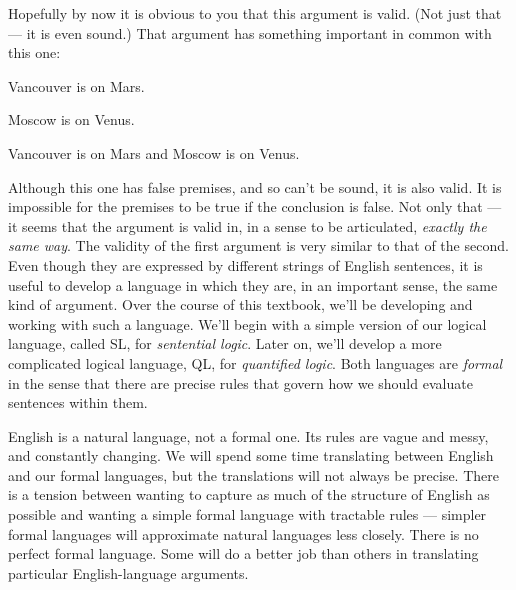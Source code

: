 Hopefully by now it is obvious to you that this argument is valid. (Not just that --- it is even sound.) That argument has something important in common with this one:

\begin{earg}
\item[] Vancouver is on Mars.
\item[] Moscow is on Venus.
\item[\therefore] Vancouver is on Mars and Moscow is on Venus.
\end{earg}

Although this one has false premises, and so can't be sound, it is also valid. It is impossible for the premises to be true if the conclusion is false. Not only that --- it seems that the argument is valid in, in a sense to be articulated, \emph{exactly the same way}. The validity of the first argument is very similar to that of the second. Even though they are expressed by different strings of English sentences, it is useful to develop a language in which they are, in an important sense, the same kind of argument. Over the course of this textbook, we'll be developing and working with such a language. We'll begin with a simple version of our logical language, called SL, for \emph{sentential logic}. Later on, we'll develop a more complicated logical language, QL, for \emph{quantified logic}. Both languages are \emph{formal} in the sense that there are precise rules that govern how we should evaluate sentences within them.

%

English is a natural language, not a formal one. Its rules are vague and messy, and constantly changing. We will spend some time translating between English and our formal languages, but the translations will not always be precise. There is a tension between wanting to capture as much of the structure of English as possible and wanting a simple formal language with tractable rules --- simpler formal languages will approximate natural languages less closely. There is no perfect formal language. Some will do a better job than others in translating particular English-language arguments.

